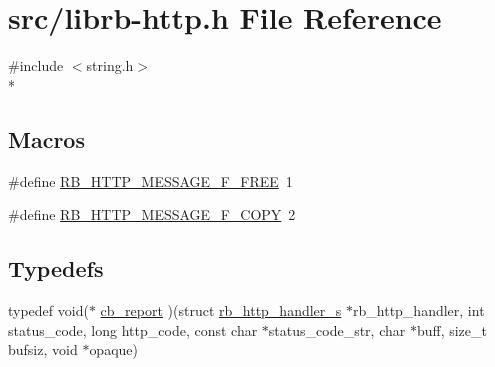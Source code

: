 \hypertarget{librb-http_8h}{\section{src/librb-\/http.h File Reference}
\label{librb-http_8h}
}
{\ttfamily \#include $<$string.\-h$>$}\\*
\subsection*{Macros}
\begin{DoxyCompactItemize}
\item 
\#define \hyperlink{librb-http_8h_aef79f44f520e54cbedce1068fe324720}{R\-B\-\_\-\-H\-T\-T\-P\-\_\-\-M\-E\-S\-S\-A\-G\-E\-\_\-\-F\-\_\-\-F\-R\-E\-E}~1
\item 
\#define \hyperlink{librb-http_8h_a0ffdecd586e5dc8f1eeede6bac9bc19f}{R\-B\-\_\-\-H\-T\-T\-P\-\_\-\-M\-E\-S\-S\-A\-G\-E\-\_\-\-F\-\_\-\-C\-O\-P\-Y}~2
\end{DoxyCompactItemize}
\subsection*{Typedefs}
\begin{DoxyCompactItemize}
\item 
typedef void($\ast$ \hyperlink{librb-http_8h_abcf27caf85ec3ac2b11d1b89aed63966}{cb\-\_\-report} )(struct \hyperlink{structrb__http__handler__s}{rb\-\_\-http\-\_\-handler\-\_\-s} $\ast$rb\-\_\-http\-\_\-handler, int status\-\_\-code, long http\-\_\-code, const char $\ast$status\-\_\-code\-\_\-str, char $\ast$buff, size\-\_\-t bufsiz, void $\ast$opaque)
\end{DoxyCompactItemize}
